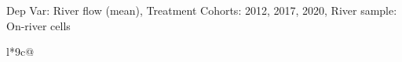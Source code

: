 \begin{table}[H]
\captionlistentry[table]{}
\label{table:beaver_hydrometry_DVflow_mean_SCg123}
\tiny %
Dep Var: River flow (mean), Treatment Cohorts: 2012, 2017, 2020, River sample: On-river cells \\
\begin{threeparttable}
\begin{tabulary}{\textwidth}{l*{9}{c}@{}}
\toprule \toprule
\noalign{\smallskip}
\noalign{\smallskip}
\midrule \bottomrule
\end{tabulary}
\medskip
\end{threeparttable}
\end{table}
